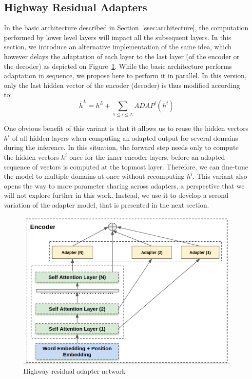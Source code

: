 \documentclass[11pt,a4paper]{article}
\begin{document}
\subsection{Highway Residual Adapters \label{ssec:highway}}

In the basic architecture described in Section~\ref{ssec:architecture}, the computation performed by lower level layers will impact all the subsequent layers. In this section, we introduce an alternative implementation of the same idea, which however delays the adaptation of each layer to the last layer (of the encoder or the decoder) as depicted on Figure~\ref{fig:hrl-architecture}. While the basic architecture performs adaptation in sequence, we propose here to perform it in parallel. In this version, only the last hidden vector of the encoder (decoder) is thus modified according to:
\begin{equation}
  \bar{h}^L = h^L + \displaystyle{\mathop{\sum}_{1 \leq i \leq L} ADAP^i(h^i)} \label{eq:highway-output}
\end{equation}

One obvious benefit of this variant is that it allows us to reuse the hidden vectors $h^i$ of all hidden layers when computing an adapted output for several domains during the inference. In this situation, the forward step needs only to compute the hidden vectors $h^i$ once for the inner encoder layers, before an adapted sequence of vectors is computed at the topmost layer. Therefore, we can fine-tune the model to multiple domains at once without recomputing $h^i$. This variant also opens the way to more parameter sharing across adapters, a perspective that we will not explore further in this work. Instead, we use it to develop a second variation of the adapter model, that is presented in the next section.

\begin{figure}[htbp]
  \centering
  \includegraphics[scale=0.3]{fig/highway_residual}
  \caption{Highway residual adapter network}
  \label{fig:hrl-architecture}
\end{figure}
\end{document}
